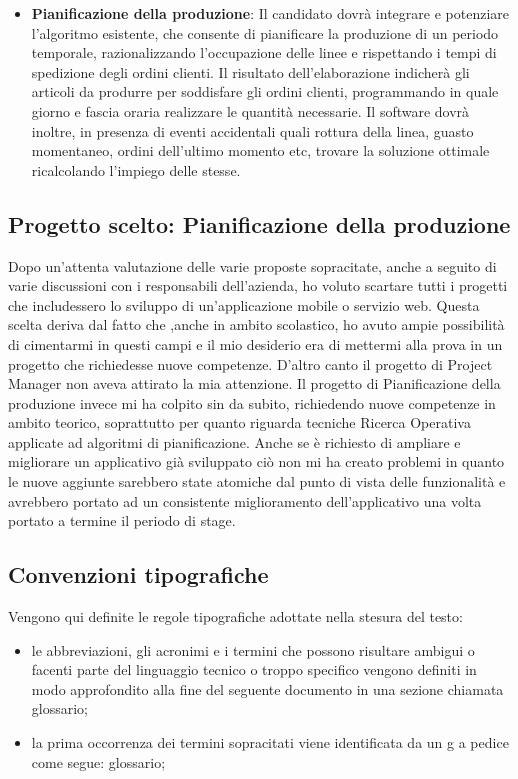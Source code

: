 \begin{itemize}
	\item \textbf{Pianificazione della produzione}: Il candidato dovrà integrare e potenziare l’algoritmo esistente, che consente di
	pianificare la produzione di un periodo temporale, razionalizzando l’occupazione delle
	linee e rispettando i tempi di spedizione degli ordini clienti.
	Il risultato dell’elaborazione indicherà gli articoli da produrre per soddisfare gli ordini
	clienti, programmando in quale giorno e fascia oraria realizzare le quantità necessarie. Il
	software dovrà inoltre, in presenza di eventi accidentali quali rottura della linea, guasto
	momentaneo, ordini dell’ultimo momento etc, trovare la soluzione ottimale
	ricalcolando l’impiego delle stesse.
	
	
\end{itemize}

\subsection{Progetto scelto: Pianificazione della produzione}
Dopo un'attenta valutazione delle varie proposte sopracitate, anche a seguito di varie discussioni con i responsabili dell'azienda, ho voluto scartare tutti i progetti che includessero lo sviluppo di un'applicazione mobile o servizio web. Questa scelta deriva dal fatto che ,anche in ambito scolastico, ho avuto ampie possibilità di cimentarmi in questi campi e il mio desiderio era di mettermi alla prova in un progetto che richiedesse nuove competenze. D'altro canto il progetto di Project Manager non aveva attirato la mia attenzione. Il progetto di Pianificazione della produzione invece mi ha colpito sin da subito, richiedendo nuove competenze in ambito teorico, soprattutto per quanto riguarda tecniche Ricerca Operativa applicate ad algoritmi di pianificazione. Anche se è richiesto di ampliare e migliorare un applicativo già sviluppato ciò non mi ha creato problemi in quanto le nuove aggiunte sarebbero state atomiche dal punto di vista delle funzionalità e avrebbero portato ad un consistente miglioramento dell'applicativo una volta portato a termine il periodo di stage.

\pagebreak

\subsection{Convenzioni tipografiche}

Vengono qui definite le regole tipografiche adottate nella stesura del testo:

\begin{itemize}
	\item le abbreviazioni, gli acronimi e i termini che possono risultare ambigui o facenti parte del linguaggio tecnico o troppo specifico vengono definiti in modo approfondito alla fine del seguente documento in una sezione chiamata glossario;
	
	\item la prima occorrenza dei termini sopracitati viene identificata da un g a pedice come segue: glossario\glo;
	
\end{itemize}

